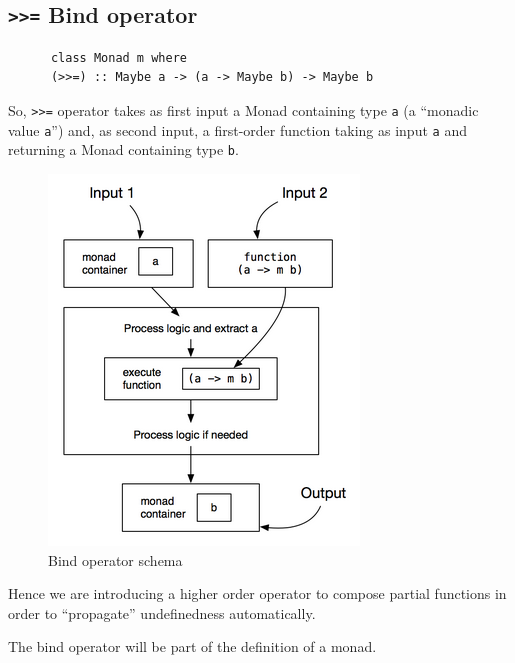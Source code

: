 
\subsection{\texttt{>>=} Bind operator}

\begin{paracol}{2}
   
   \begin{lstlisting}
      class Monad m where
      (>>=) :: Maybe a -> (a -> Maybe b) -> Maybe b
   \end{lstlisting}
   
   So, \lstinline|>>=| operator takes as first input a Monad containing type \lstinline|a| (a ``monadic value \lstinline|a|'') and, as second input, a first-order function taking as input \lstinline|a| and returning a Monad containing type \lstinline|b|.

   \switchcolumn
   \begin{figure}[htbp]
      \centering
      \includegraphics{images/monads_bind.png}
      \caption{Bind operator schema}
      \label{fig:monads_bind}
   \end{figure}
\end{paracol}

Hence we are introducing a higher order operator to
compose partial functions in order to
``propagate'' undefinedness automatically.

The bind operator will be part of the definition
of a monad.

